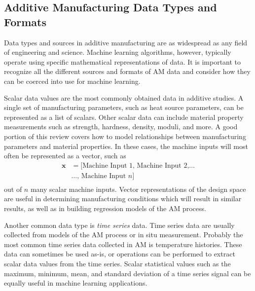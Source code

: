 \subsection{Additive Manufacturing Data Types and Formats}
Data types and sources in additive manufacturing are as widespread as any field of engineering and science. Machine learning algorithms, however, typically operate using specific mathematical representations of data. It is important to recognize all the different sources and formats of AM data and consider how they can be coerced into use for machine learning. 

Scalar data values are the most commonly obtained data in additive studies. A single set of manufacturing parameters, such as heat source parameters, can be represented as a list of scalars. Other scalar data can include material property measurements such as strength, hardness, density, moduli, and more. A good portion of this review covers how to model relationships between manufacturing parameters and material properties. In these cases, the machine inputs will most often be represented as a vector, such as
\begin{equation}
\begin{split}
	\mathbf{x} & = \text{[} \text{Machine Input 1, Machine Input 2,} \hdots  \\
		& \hdots \text{, Machine Input } n \text{]} \\
	\label{vector}
\end{split}
\end{equation}
out of $n$ many scalar machine inputs. Vector representations of the design space are useful in determining manufacturing conditions which will result in similar results, as well as in building regression models of the AM process.

Another common data type is \textit{time series} data. Time series data are usually collected from models of the AM process or in situ measurement. Probably the most common time series data collected in AM is temperature histories. These data can sometimes be used as-is, or operations can be performed to extract scalar data values from the time series. Scalar statistical values such as the maximum, minimum, mean, and standard deviation of a time series signal can be equally useful in machine learning applications.

